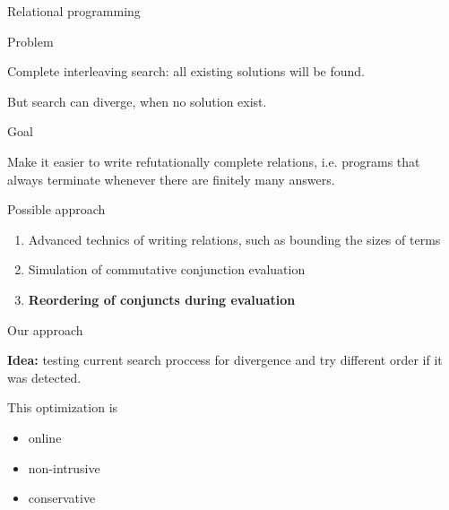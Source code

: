 \documentclass[final]{beamer}
\newlength{\onecolwid}
\begin{document}
\begin{frame}[fragile]
\begin{columns}[t]
\begin{column}{\onecolwid}
\begin{block}{Relational programming}
\end{block}
\begin{block}{Problem}

Complete interleaving search: all existing solutions will be found.

But search can diverge, when no solution exist.

\end{block}

\begin{alertblock}{Goal}

Make it easier to write refutationally complete relations, i.e. programs that always terminate whenever there are finitely many answers.

\end{alertblock}

\begin{block}{Possible approach}

\begin{enumerate}
  \item Advanced technics of writing relations, such as bounding the sizes of terms
  \item Simulation of commutative conjunction evaluation
  \item \textbf{Reordering of conjuncts during evaluation}
\end{enumerate}

\end{block}


\begin{block}{Our approach}

\textbf{Idea:} testing current search proccess for divergence and try different order if it was detected.

This optimization is

\begin{itemize}
  \item online
  \item non-intrusive
  \item conservative
\end{itemize}

\end{block}

\begin{comment}

\begin{block}{Relational programming}

Relational programming is a technic of writing programs as relations. It allows using relational programs in unexpected ways.


\end{comment}
\end{column}
\end{columns}
\end{frame}
\end{document}
